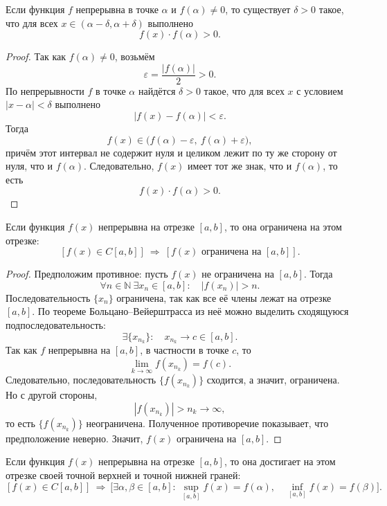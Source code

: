 \begin{theorem}
Если функция \(f\) непрерывна в точке \(\alpha\) и \(f(\alpha)\ne 0\), то
существует \(\delta>0\) такое, что для всех \(x\in(\alpha-\delta,\alpha+\delta)\)
выполнено
\[
f(x)\cdot f(\alpha)>0.
\]
\end{theorem}

\begin{proof}
Так как \(f(\alpha)\ne 0\), возьмём
\[
\varepsilon=\frac{|f(\alpha)|}{2}>0.
\]
По непрерывности \(f\) в точке \(\alpha\) найдётся \(\delta>0\) такое, что
для всех \(x\) с условием \(|x-\alpha|<\delta\) выполнено
\[
|f(x)-f(\alpha)|<\varepsilon.
\]
Тогда
\[
f(x)\in\bigl(f(\alpha)-\varepsilon,\ f(\alpha)+\varepsilon\bigr),
\]
причём этот интервал не содержит нуля и целиком лежит по ту же сторону
от нуля, что и \(f(\alpha)\). Следовательно, \(f(x)\) имеет тот же знак,
что и \(f(\alpha)\), то есть
\[
f(x)\cdot f(\alpha)>0.
\]
\end{proof}


\begin{theorem}
Если функция \(f(x)\) непрерывна на отрезке \([a,b]\), то она ограничена на этом
отрезке:
\[
[f(x)\in C[a,b]]\ \Longrightarrow\ [f(x)\text{ ограничена на }[a,b]].
\]
\end{theorem}

\begin{proof}
Предположим противное: пусть \(f(x)\) не ограничена на \([a,b]\). Тогда
\[
\forall n\in\mathbb N\ \exists x_n\in[a,b]:\quad |f(x_n)|>n.
\]
Последовательность \(\{x_n\}\) ограничена, так как все её члены лежат на отрезке
\([a,b]\). По теореме Больцано--Вейерштрасса из неё можно выделить сходящуюся
подпоследовательность:
\[
\exists \{x_{n_k}\}:\quad x_{n_k}\to c\in[a,b].
\]
Так как \(f\) непрерывна на \([a,b]\), в частности в точке \(c\), то
\[
\lim_{k\to\infty} f(x_{n_k})=f(c).
\]
Следовательно, последовательность \(\{f(x_{n_k})\}\) сходится, а значит,
ограничена. Но с другой стороны,
\[
|f(x_{n_k})|>n_k\to\infty,
\]
то есть \(\{f(x_{n_k})\}\) неограничена. Полученное противоречие показывает, что
предположение неверно. Значит, \(f(x)\) ограничена на \([a,b]\).
\end{proof}

\begin{theorem}
Если функция \(f(x)\) непрерывна на отрезке \([a,b]\), то она достигает на этом
отрезке своей точной верхней и точной нижней граней:
\[
[f(x)\in C[a,b]]
\ \Longrightarrow\
\bigl[\exists \alpha,\beta\in[a,b]:\
\sup_{[a,b]} f(x)=f(\alpha),\quad
\inf_{[a,b]} f(x)=f(\beta)\bigr].
\]
\end{theorem}

